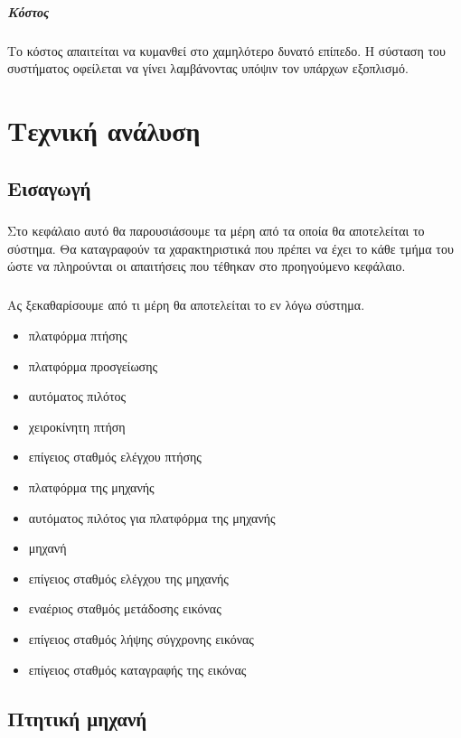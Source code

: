 \documentclass[a4paper, 12pt, twoside]{report}
\begin{document}
{{{{{ 			\paragraph{Κόστος}{Το κόστος απαιτείται να κυμανθεί στο χαμηλότερο δυνατό επίπεδο. Η σύσταση του συστήματος οφείλεται να γίνει λαμβάνοντας υπόψιν τον υπάρχων εξοπλισμό.
 			
 	\chapter{Τεχνική ανάλυση}
		\section{Εισαγωγή}
			\paragraph{}{Στο κεφάλαιο αυτό θα παρουσιάσουμε τα μέρη από τα οποία θα αποτελείται το σύστημα. Θα καταγραφούν τα χαρακτηριστικά που πρέπει να έχει το κάθε τμήμα του ώστε να πληρούνται οι απαιτήσεις που τέθηκαν στο προηγούμενο κεφάλαιο.
			}
			
			\paragraph{}{Ας ξεκαθαρίσουμε από τι μέρη θα αποτελείται το εν λόγω σύστημα.
			\begin{itemize}
				\item πλατφόρμα πτήσης
				\item πλατφόρμα προσγείωσης
				\item αυτόματος πιλότος
				\item χειροκίνητη πτήση
				\item επίγειος σταθμός ελέγχου πτήσης
				\item πλατφόρμα της μηχανής
				\item αυτόματος πιλότος για πλατφόρμα της μηχανής
				\item μηχανή
				\item επίγειος σταθμός ελέγχου της μηχανής
				\item εναέριος σταθμός μετάδοσης εικόνας
				\item επίγειος σταθμός λήψης σύγχρονης εικόνας
				\item επίγειος σταθμός καταγραφής της εικόνας
			\end{itemize}
			}
		
		
		\section{Πτητική μηχανή}
}}}}}}
\end{document}
